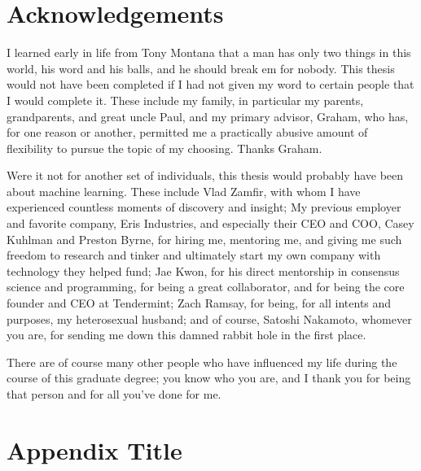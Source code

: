 \documentclass[12pt]{report}
\begin{document}
\chapter*{Acknowledgements}
I learned early in life from Tony Montana that a man has only two things in this world, his word and his balls, and he should break em for nobody.
This thesis would not have been completed if I had not given my word to certain people that I would complete it.
These include my family, in particular my parents, grandparents, and great uncle Paul, and my primary advisor, Graham,
who has, for one reason or another, permitted me a practically abusive amount of flexibility to pursue the topic of my choosing.
Thanks Graham.

Were it not for another set of individuals, this thesis would probably have been about machine learning.
These include Vlad Zamfir, with whom I have experienced countless moments of discovery and insight;
My previous employer and favorite company, Eris Industries, and especially their CEO and COO, Casey Kuhlman and Preston Byrne,
for hiring me, mentoring me, and giving me such freedom to research and tinker and ultimately start my own company with technology they helped fund;
Jae Kwon, for his direct mentorship in consensus science and programming, for being a great collaborator, and for being the core founder and CEO at Tendermint;
Zach Ramsay, for being, for all intents and purposes, my heterosexual husband;
and of course, Satoshi Nakamoto, whomever you are, for sending me down this damned rabbit hole in the first place.

There are of course many other people who have influenced my life during the course of this graduate degree;
you know who you are, and I thank you for being that person and for all you've done for me.

\tableofcontents
\listoffigures
\listoftables
{}














\appendix
\chapter{Appendix Title}





\end{document}
